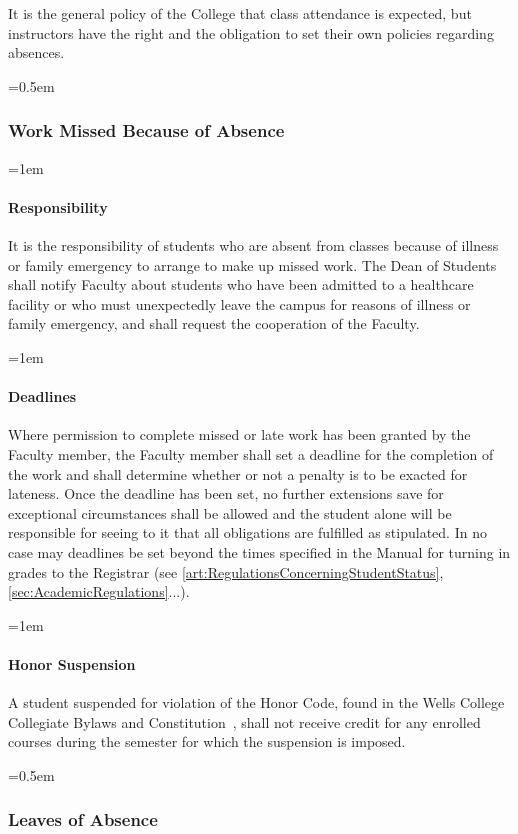 \documentclass{manual}
\newcommand{\constitution}{Wells College Collegiate Bylaws and Constitution~}
\let\oldsubsubsection\subsubsection
\renewcommand\subsubsection{\leftskip=0.5em\oldsubsubsection}
\let\oldparagraph\paragraph
\renewcommand\paragraph{\leftskip=1em\oldparagraph}
\begin{document}
It is the general policy of the College that class attendance is expected, but instructors have the right and the obligation to set their own policies regarding absences.

\subsubsection{Work Missed Because of Absence}

\paragraph{Responsibility}
It is the responsibility of students who are absent from classes because of illness or family emergency to arrange to make up missed work. The Dean of Students shall notify Faculty about students who have been admitted to a healthcare facility or who must unexpectedly leave the campus for reasons of illness or family emergency, and shall request the cooperation of the Faculty.

\paragraph{Deadlines}
Where permission to complete missed or late work has been granted by the Faculty member, the Faculty member shall set a deadline for the completion of the work and shall determine whether or not a penalty is to be exacted for lateness. Once the deadline has been set, no further extensions save for exceptional circumstances shall be allowed and the student alone will be responsible for seeing to it that all obligations are fulfilled as stipulated. In no case may deadlines be set beyond the times specified in the Manual for turning in grades to the Registrar (see \cref{art:RegulationsConcerningStudentStatus}, \cref{sec:AcademicRegulations}...).

\paragraph{Honor Suspension}
A student suspended for violation of the Honor Code, found in the \constitution, shall not receive credit for any enrolled courses during the semester for which the suspension is imposed.

\subsubsection{Leaves of Absence}
\end{document}
